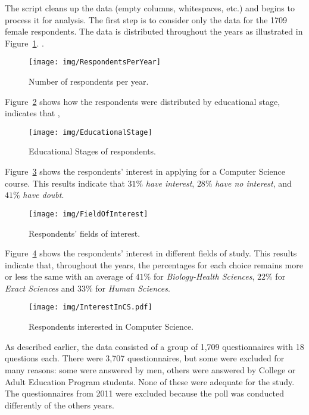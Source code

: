 The script cleans up the data (empty columns, whitespaces, etc.) and begins to process it for analysis. The first step is to consider only the data for the 1709 female respondents. The data is distributed throughout the years as illustrated in Figure~\ref{fig:RespondentsPerYear}. .

\begin{figure}%
\texttt{[image: img/RespondentsPerYear]}%
\caption{Number of respondents per year.}%
\label{fig:RespondentsPerYear}%
\end{figure}%

Figure~\ref{fig:EducationalStage} shows how the respondents were distributed by educational stage, indicates that ,

\begin{figure}%
\texttt{[image: img/EducationalStage]}%
\caption{Educational Stages of respondents.}%
\label{fig:EducationalStage}%
\end{figure}%

Figure~\ref{fig:FieldOfInterest} shows the respondents' interest in applying for a Computer Science course. This results indicate that $31\%$  \emph{have interest}, $28\%$  \emph{have no interest}, and $41\%$  \emph{have doubt}.

\begin{figure}%
\texttt{[image: img/FieldOfInterest]}%
\caption{Respondents' fields of interest.}%
\label{fig:FieldOfInterest}%
\end{figure}%

Figure~\ref{fig:InterestInCS.pdf} shows the respondents' interest in different fields of study. This results indicate that, throughout the years, the percentages for each choice remains more or less the same with an average of $41\%$ for \emph{Biology-Health Sciences}, $22\%$ for \emph{Exact Sciences} and $33\%$ for \emph{Human Sciences}.

\begin{figure}%
\texttt{[image: img/InterestInCS.pdf]}%
\caption{Respondents interested in Computer Science.}%
\label{fig:InterestInCS.pdf}%
\end{figure}%

As described earlier, the data consisted of a group of 1,709 questionnaires with 18 questions each. There were 3,707 questionnaires, but some were excluded for many reasons: some were answered by men, others were answered by College or Adult Education Program students. None of these were adequate for the study. The questionnaires from 2011 were excluded because the poll was conducted differently of the others years.


